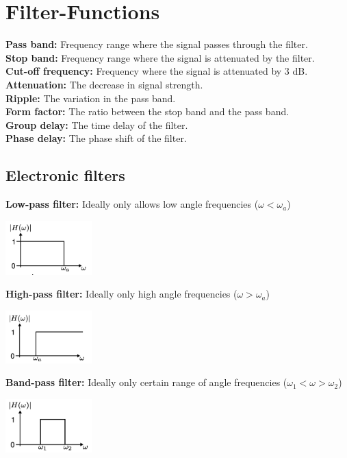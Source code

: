 \section{Filter-Functions}

\textbf{Pass band:} Frequency range where the signal passes through the filter.\\
\textbf{Stop band:} Frequency range where the signal is attenuated by the filter.\\
\textbf{Cut-off frequency:} Frequency where the signal is attenuated by 3 dB.\\
\textbf{Attenuation:} The decrease in signal strength.\\
\textbf{Ripple:} The variation in the pass band.\\
\textbf{Form factor:} The ratio between the stop band and the pass band.\\
\textbf{Group delay:} The time delay of the filter.\\
\textbf{Phase delay:} The phase shift of the filter.

\subsection{Electronic filters}
\textbf{Low-pass filter:} Ideally only allows low angle frequencies ($\omega<\omega_{a}$)
\begin{center}
  \includegraphics[width=0.25\textwidth]{Images/Lowpass.png}
\end{center}

\textbf{High-pass filter:} Ideally only high angle frequencies ($\omega>\omega_{a}$)
\begin{center}
  \includegraphics[width=0.25\textwidth]{Images/Highpass.png}
\end{center}

\textbf{Band-pass filter:} Ideally only certain range of angle frequencies ($\omega_{1}<\omega>\omega_{2}$) 
\begin{center}
  \includegraphics[width=0.25\textwidth]{Images/Bandpass.png}
\end{center}

